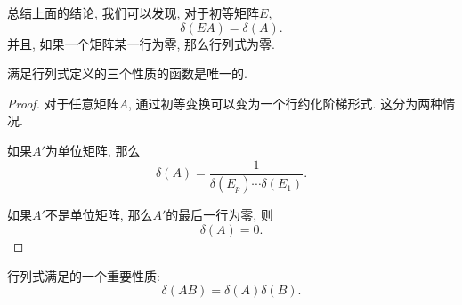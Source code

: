 总结上面的结论, 我们可以发现, 对于初等矩阵$E$, 
\begin{equation}
  \delta (EA) = \delta (A).
\end{equation}
并且, 如果一个矩阵某一行为零, 那么行列式为零.

\begin{proposition}
    满足行列式定义的三个性质的函数是唯一的.
\end{proposition}

\begin{proof}
    对于任意矩阵$A$, 通过初等变换可以变为一个行约化阶梯形式.
    这分为两种情况.

    如果$A'$为单位矩阵, 那么
    \begin{equation}
      \delta (A)  = \frac{1}{\delta(E_p) \cdots \delta(E_1)}.
    \end{equation}

    如果$A'$不是单位矩阵, 那么$A'$的最后一行为零, 则
    \begin{equation}
      \delta (A) = 0.
    \end{equation}
\end{proof}

行列式满足的一个重要性质: 
\begin{equation}
  \delta (AB) = \delta (A) \delta (B).
\end{equation}
